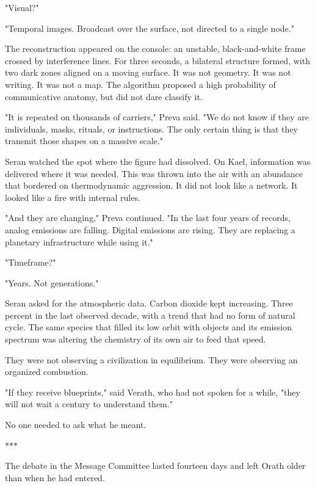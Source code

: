\documentclass[11pt,a5paper,twoside]{book}
\begin{document}
"Visual?"

"Temporal images. Broadcast over the surface, not directed to a single node."

The reconstruction appeared on the console: an unstable, black-and-white frame crossed by interference lines. For three seconds, a bilateral structure formed, with two dark zones aligned on a moving surface. It was not geometry. It was not writing. It was not a map. The algorithm proposed a high probability of communicative anatomy, but did not dare classify it.

"It is repeated on thousands of carriers," Preva said. "We do not know if they are individuals, masks, rituals, or instructions. The only certain thing is that they transmit those shapes on a massive scale."

Seran watched the spot where the figure had dissolved. On Kael, information was delivered where it was needed. This was thrown into the air with an abundance that bordered on thermodynamic aggression. It did not look like a network. It looked like a fire with internal rules.

"And they are changing," Preva continued. "In the last four years of records, analog emissions are falling. Digital emissions are rising. They are replacing a planetary infrastructure while using it."

"Timeframe?"

"Years. Not generations."

Seran asked for the atmospheric data. Carbon dioxide kept increasing. Three percent in the last observed decade, with a trend that had no form of natural cycle. The same species that filled its low orbit with objects and its emission spectrum was altering the chemistry of its own air to feed that speed.

They were not observing a civilization in equilibrium. They were observing an organized combustion.

"If they receive blueprints," said Verath, who had not spoken for a while, "they will not wait a century to understand them."

No one needed to ask what he meant.

\vspace{1.5em}
\begin{center}$\ast$\quad$\ast$\quad$\ast$\end{center}
\vspace{1.5em}

The debate in the Message Committee lasted fourteen days and left Orath older than when he had entered.
\end{document}
